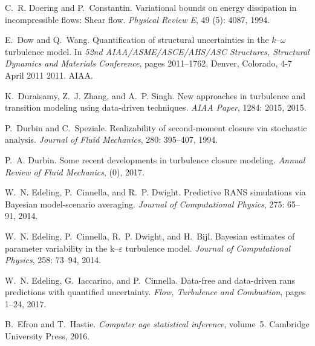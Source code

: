 \documentclass[a4paper]{ar-1col}
\begin{document}
\begin{thebibliography}{82}
C.~R. Doering and P.~Constantin.
\newblock Variational bounds on energy dissipation in incompressible flows:
  Shear flow.
\newblock \emph{Physical Review E}, 49 (5): 4087, 1994.

E.~Dow and Q.~Wang.
\newblock Quantification of structural uncertainties in the $k$--$\omega$
  turbulence model.
\newblock In \emph{52nd AIAA/ASME/ASCE/AHS/ASC Structures, Structural Dynamics
  and Materials Conference}, pages 2011--1762, Denver, Colorado, 4-7 April 2011
  2011. AIAA.

K.~Duraisamy, Z.~J. Zhang, and A.~P. Singh.
\newblock New approaches in turbulence and transition modeling using
  data-driven techniques.
\newblock \emph{AIAA Paper}, 1284: 2015, 2015.

P.~Durbin and C.~Speziale.
\newblock Realizability of second-moment closure via stochastic analysis.
\newblock \emph{Journal of Fluid Mechanics}, 280: 395--407, 1994.

P.~A. Durbin.
\newblock Some recent developments in turbulence closure modeling.
\newblock \emph{Annual Review of Fluid Mechanics},  (0), 2017.

W.~N. Edeling, P.~Cinnella, and R.~P. Dwight.
\newblock Predictive {RANS} simulations via {Bayesian} model-scenario
  averaging.
\newblock \emph{Journal of Computational Physics}, 275: 65--91,
  2014{}.

W.~N. Edeling, P.~Cinnella, R.~P. Dwight, and H.~Bijl.
\newblock Bayesian estimates of parameter variability in the k--$\varepsilon$
  turbulence model.
\newblock \emph{Journal of Computational Physics}, 258: 73--94,
  2014{}.

W.~N. Edeling, G.~Iaccarino, and P.~Cinnella.
\newblock Data-free and data-driven rans predictions with quantified
  uncertainty.
\newblock \emph{Flow, Turbulence and Combustion}, pages 1--24, 2017.

B.~Efron and T.~Hastie.
\newblock \emph{Computer age statistical inference}, volume~5.
\newblock Cambridge University Press, 2016.


\end{thebibliography}
\end{document}
